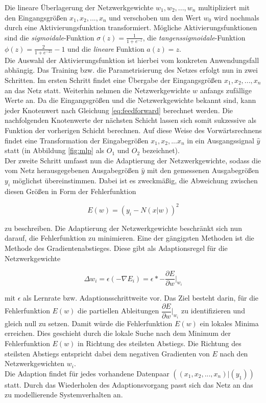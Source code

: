 Die lineare Überlagerung der Netzwerkgewichte $w_1,w_2,...,w_n$ multipliziert mit den Eingangsgrößen $x_1,x_2,...,x_n$ und verschoben um den Wert $w_0$ wird nochmals durch eine Aktivierungsfunktion transformiert. Mögliche Aktivierungsfunktionen sind die \textit{sigmoidale}-Funktion $\sigma(z) = \frac{1}{1 + e^{-z}}$, die \textit{tangenssigmoidale}-Funktion $\phi(z)=\frac{2}{1 + e^{-2z}}-1$ und die \textit{lineare} Funktion $a(z)=z$. \\ 
Die Auswahl der Aktivierungsfunktion ist hierbei vom konkreten Anwendungsfall abhängig. Das Training bzw. die Parametrisierung des Netzes erfolgt nun in zwei Schritten. Im ersten Schritt findet eine Übergabe der Eingangsgrößen $x_1,x_2,...,x_n$ an das Netz statt. Weiterhin nehmen die Netzwerkgewichte $w$ anfangs zufällige Werte an. Da die Eingangsgrößen und die Netzwerkgewichte bekannt sind, kann jeder Knotenwert nach Gleichung \ref{eq:feedforward} berechnet werden. Die nachfolgenden Knotenwerte der nächsten Schicht lassen sich somit sukzessive als Funktion der vorherigen Schicht berechnen. Auf diese Weise des Vorwärtsrechnens findet eine Transformation der Eingabegrößen $x_1,x_2,...x_n$ in ein Ausgangssignal $\hat{y}$ statt (in Abbildung \ref{fig:mlp} als $O_1$ und $O_2$ bezeichnet). \\
Der zweite Schritt umfasst nun die Adaptierung der Netzwerkgewichte, sodass die vom Netz herausgegebenen Ausgabegrößen $\hat{y}$ mit den gemessenen Ausgabegrößen $y_i$ möglichst übereinstimmen. Dabei ist es zweckmäßig, die Abweichung zwischen diesen Größen in Form der Fehlerfunktion 

\begin{equation}
E(w) = (y_i-N(x|w))^{2}
\end{equation}

zu beschreiben. Die Adaptierung der Netzwerkgewichte beschränkt sich nun darauf, die Fehlerfunktion zu minimieren. Eine der gängigsten Methoden ist die Methode des Gradientenabstieges. Diese gibt als Adaptionsregel für die Netzwerkgewichte 

\begin{equation}
\label{eq:weight_adapt}
\Delta w_i = \epsilon  (-\nabla E_i) = \epsilon * - \dfrac{\partial E}{\partial w}\bigg|_{w_i}
\end{equation}

mit $\epsilon$ als Lernrate bzw. Adaptionsschrittweite vor. Das Ziel besteht darin, für die Fehlerfunktion $E(w)$ die partiellen Ableitungen $\dfrac{\partial E}{\partial w}\bigg|_{w_i}$ zu identifizieren und gleich null zu setzen. Damit würde die Fehlerfunktion $E(w)$ ein lokales Minima erreichen. Dies geschieht durch die lokale Suche nach dem Minimum der Fehlerfunktion $E(w)$ in Richtung des steilsten Abstiegs. Die Richtung des steilsten Abstiegs entspricht dabei dem negativen Gradienten von $E$ nach den Netzwerkgewichten $w_i$.\\ 
Die Adaption findet für jedes vorhandene Datenpaar $((x_1,x_2,...,x_n)|(y_1))$ statt. Durch das Wiederholen des Adaptionsvorgang passt sich das Netz an das zu modellierende Systemverhalten an. \\

